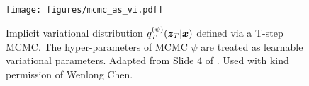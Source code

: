 \begin{figure}[t]
    \centering
\texttt{[image: figures/mcmc\_as\_vi.pdf]}
\vspace{-2em}
    \caption{Implicit variational distribution $q_T^{(\psi)}(\bm{z}_T|\bm{x})$ defined via a T-step MCMC. The hyper-parameters of MCMC $\psi$ are treated as learnable variational parameters. Adapted from Slide 4 of \citet{campbell2021gradientSlide}. Used with kind permission of Wenlong Chen.}
    \label{fig: mcmc_as_vi}
\end{figure}
